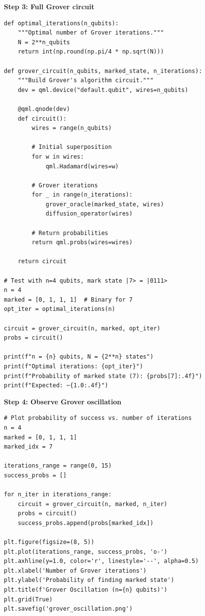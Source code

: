 \documentclass[11pt,a4paper]{article}
\begin{document}
\textbf{Step 3: Full Grover circuit}
\begin{lstlisting}
def optimal_iterations(n_qubits):
    """Optimal number of Grover iterations."""
    N = 2**n_qubits
    return int(np.round(np.pi/4 * np.sqrt(N)))

def grover_circuit(n_qubits, marked_state, n_iterations):
    """Build Grover's algorithm circuit."""
    dev = qml.device("default.qubit", wires=n_qubits)
    
    @qml.qnode(dev)
    def circuit():
        wires = range(n_qubits)
        
        # Initial superposition
        for w in wires:
            qml.Hadamard(wires=w)
        
        # Grover iterations
        for _ in range(n_iterations):
            grover_oracle(marked_state, wires)
            diffusion_operator(wires)
        
        # Return probabilities
        return qml.probs(wires=wires)
    
    return circuit

# Test with n=4 qubits, mark state |7> = |0111>
n = 4
marked = [0, 1, 1, 1]  # Binary for 7
opt_iter = optimal_iterations(n)

circuit = grover_circuit(n, marked, opt_iter)
probs = circuit()

print(f"n = {n} qubits, N = {2**n} states")
print(f"Optimal iterations: {opt_iter}")
print(f"Probability of marked state (7): {probs[7]:.4f}")
print(f"Expected: ~{1.0:.4f}")
\end{lstlisting}

\textbf{Step 4: Observe Grover oscillation}
\begin{lstlisting}
# Plot probability of success vs. number of iterations
n = 4
marked = [0, 1, 1, 1]
marked_idx = 7

iterations_range = range(0, 15)
success_probs = []

for n_iter in iterations_range:
    circuit = grover_circuit(n, marked, n_iter)
    probs = circuit()
    success_probs.append(probs[marked_idx])

plt.figure(figsize=(8, 5))
plt.plot(iterations_range, success_probs, 'o-')
plt.axhline(y=1.0, color='r', linestyle='--', alpha=0.5)
plt.xlabel('Number of Grover iterations')
plt.ylabel('Probability of finding marked state')
plt.title(f'Grover Oscillation (n={n} qubits)')
plt.grid(True)
plt.savefig('grover_oscillation.png')
\end{lstlisting}
\end{document}

